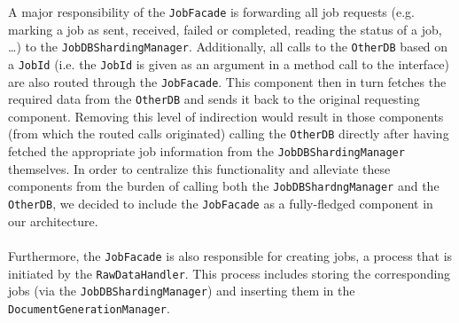 \documentclass[a4paper,10pt]{article}
\begin{document}
A major responsibility of the \texttt{JobFacade} is forwarding all job requests (e.g. marking a job as sent, received, failed or completed, reading the status of a job, \dots) to the \texttt{JobDBShardingManager}. Additionally, all calls to the \texttt{OtherDB} based on a \texttt{JobId} (i.e. the \texttt{JobId} is given as an argument in a method call to the interface) are also routed through the \texttt{JobFacade}. This component then in turn fetches the required data from the \texttt{OtherDB} and sends it back to the original requesting component. Removing this level of indirection would result in those components (from which the routed calls originated) calling the \texttt{OtherDB} directly after having fetched the appropriate job information from the \texttt{JobDBShardingManager} themselves. In order to centralize this functionality and alleviate these components from the burden of calling both the \texttt{JobDBShardngManager} and the \texttt{OtherDB}, we decided to include the \texttt{JobFacade} as a fully-fledged component in our architecture.\\\\
Furthermore, the \texttt{JobFacade} is also responsible for creating jobs, a process that is initiated by the \texttt{RawDataHandler}. This process includes storing the corresponding jobs (via the \texttt{JobDBShardingManager}) and inserting them in the \texttt{DocumentGenerationManager}.
\end{document}
